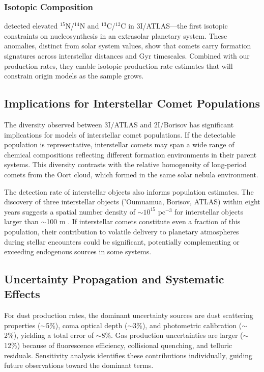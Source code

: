 \documentclass[preprint2]{aastex631}
\begin{document}
\subsubsection{Isotopic Composition}

\citet{opitom26} detected elevated $^{15}$N/$^{14}$N and $^{13}$C/$^{12}$C in 3I/ATLAS---the first isotopic constraints on nucleosynthesis in an extrasolar planetary system. These anomalies, distinct from solar system values, show that comets carry formation signatures across interstellar distances and Gyr timescales. Combined with our production rates, they enable isotopic production rate estimates that will constrain origin models as the sample grows.

\subsection{Implications for Interstellar Comet Populations}

The diversity observed between 3I/ATLAS and 2I/Borisov has significant implications for models of interstellar comet populations. If the detectable population is representative, interstellar comets may span a wide range of chemical compositions reflecting different formation environments in their parent systems. This diversity contrasts with the relative homogeneity of long-period comets from the Oort cloud, which formed in the same solar nebula environment.

The detection rate of interstellar objects also informs population estimates. The discovery of three interstellar objects ('Oumuamua, Borisov, ATLAS) within eight years suggests a spatial number density of $\sim 10^{15}$ pc$^{-3}$ for interstellar objects larger than $\sim$100 m \citep{jewitt22}. If interstellar comets constitute even a fraction of this population, their contribution to volatile delivery to planetary atmospheres during stellar encounters could be significant, potentially complementing or exceeding endogenous sources in some systems.

\subsection{Uncertainty Propagation and Systematic Effects}

For dust production rates, the dominant uncertainty sources are dust scattering properties ($\sim$5\%), coma optical depth ($\sim$3\%), and photometric calibration ($\sim$2\%), yielding a total error of $\sim$8\%. Gas production uncertainties are larger ($\sim$12\%) because of fluorescence efficiency, collisional quenching, and telluric residuals. Sensitivity analysis identifies these contributions individually, guiding future observations toward the dominant terms.
\end{document}
